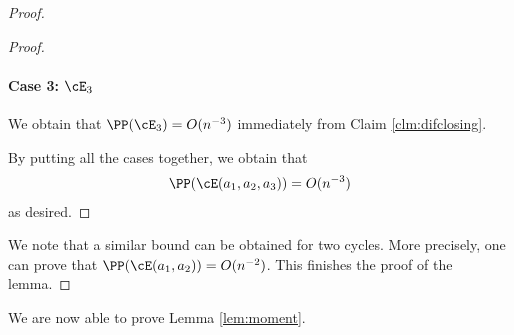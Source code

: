 \documentclass{article}
\begin{document}
\begin{proof}
\begin{proof}
    \paragraph{\textbf{Case 3: $\cE_3$}}
    We obtain that $\PP(\cE_3)=O(n^{-3})$ immediately from Claim \ref{clm:difclosing}.

    By putting all the cases together, we obtain that 
    \begin{align*}
    \PP(\cE(a_1,a_2,a_3))=O(n^{-3})
    \end{align*}
    as desired.
\end{proof}

We note that a similar bound can be obtained for two cycles. More precisely, one can prove that $\PP(\cE(a_1,a_2))=O(n^{-2})$. This finishes the proof of the lemma.
\end{proof}


We are now able to prove Lemma \ref{lem:moment}.
\end{document}
